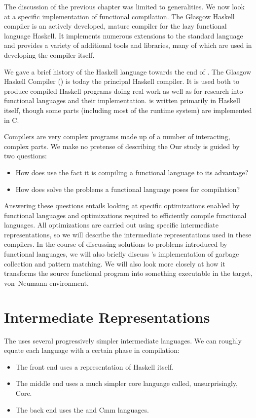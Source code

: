 \label{casestudy}
The discussion of the previous chapter was limited to generalities. We now look at a specific implementation of functional compilation. The Glasgow Haskell compiler is an actively developed, mature compiler for the lazy functional language Haskell. It implements numerous extensions to the standard language and provides a variety of additional tools and libraries, many of which are used in developing the compiler itself.

We gave a brief history of the Haskell language towards the end of . The Glasgow Haskell Compiler (\GHC{}) is today the principal Haskell compiler. It is used both to produce compiled Haskell programs doing real work as well as for research into functional languages and their implementation. \GHC is written primarily in Haskell itself, though some parts (including most of the runtime system) are implemented in C.

Compilers are very complex programs made up of a number of interacting, complex parts. We make no pretense of describing the \GHC[long]  Our study is guided by two questions:
\begin{itemize}
\item
How does \GHC use the fact it is compiling a functional language to its advantage?

\item
How does \GHC solve the problems a functional language poses for compilation?
\end{itemize}

Answering these questions entails looking at specific optimizations enabled by functional languages and optimizations required to efficiently compile functional languages. All optimizations are carried out using specific intermediate representations, so we will describe the intermediate representations used in these compilers. In the course of discussing solutions to problems introduced by functional languages, we will also briefly discuss \GHC{}'s implementation of garbage collection and pattern matching. We will also look more closely at how it transforms the source functional program into something executable in the target, von~Neumann environment.

\section{Intermediate Representations}
The \GHC[long] uses several progressively simpler intermediate languages. We can roughly equate each language with a certain phase in compilation:
\begin{itemize}
\item
The front end uses a representation of Haskell itself.

\item
The middle end uses a much simpler core language called, unsurprisingly, Core.

\item
The back end uses the  and Cmm languages.
\end{itemize}


